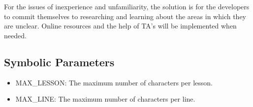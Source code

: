 \documentclass[12pt, titlepage]{article}
\begin{document}
\indent For the issues of inexperience and unfamiliarity, the solution is for the developers to commit themselves to researching and learning about the areas in which they are unclear. Online resources and the help of TA's will be implemented when needed.

\newpage

\subsection{Symbolic Parameters} \label{symbols}

\begin{itemize}
\item MAX\_LESSON: The maximum number of characters per lesson.
\item MAX\_LINE: The maximum number of characters per line.
\end{itemize}
\end{document}
